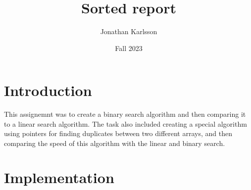 \documentclass[a4paper,11pt]{article}
\begin{document}
\title{
    \textbf{Sorted report}
}
\author{Jonathan Karlsson}
\date{Fall 2023}

\maketitle

\section*{Introduction}
This assignemnt was to create a binary search algorithm and then comparing it to a linear search algorithm. The task also
included creating a special algorithm using pointers for finding duplicates between two different arrays, and then comparing the speed of this algorithm with the 
linear and binary search. 


\section*{Implementation}
\end{document}

